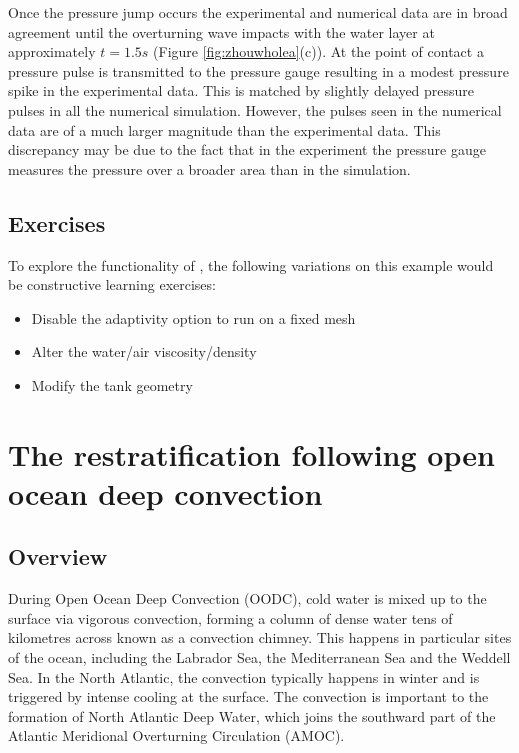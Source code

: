 Once the pressure jump occurs the experimental and numerical data are in broad agreement until the overturning wave impacts with the water layer at approximately $t=1.5s$ (Figure \ref{fig:zhouwholea}(c)).  At the point of contact a pressure pulse is transmitted to the pressure gauge resulting in a modest pressure spike in the experimental data.  This is matched by slightly delayed pressure pulses in all the numerical simulation.  However, the pulses seen in the numerical data are of a much larger magnitude than the experimental data. This discrepancy may be due to the fact that in the experiment the pressure gauge measures the pressure over a broader area than in the simulation. 

\subsection{Exercises}
To explore the functionality of \fluidity, the following variations on this example would be constructive learning exercises:

\begin{itemize}
\item Disable the adaptivity option to run on a fixed mesh
\item Alter the water/air viscosity/density
\item Modify the tank geometry
\end{itemize}





\section{The restratification following open ocean deep convection}
\label{sect:restratification_after_oodc}

\subsection{Overview}

During Open Ocean Deep Convection (OODC), cold water is mixed up to the surface via vigorous convection, forming a column of dense water tens of kilometres across known as a convection chimney. This happens in particular sites of the ocean, including the Labrador Sea, the Mediterranean Sea and the Weddell Sea.  In the North Atlantic, the convection typically happens in winter and is triggered by intense cooling at the surface. The convection is important to the formation of North Atlantic Deep Water, which joins the southward part of the Atlantic Meridional Overturning Circulation (AMOC).

